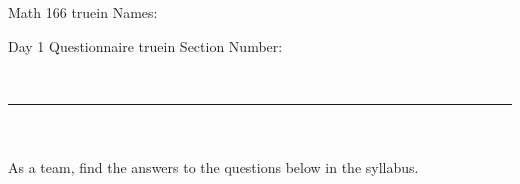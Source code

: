 \documentclass[12pt]{article}
\begin{document}
\pagestyle{empty} %

\noindent
{Math 166  truein  Names:\ \hrulefill}

\noindent
{Day 1 Questionnaire  truein  Section Number:\ \hrulefill}

\noindent 
\ \\
\hrule\ \\
\ \\
\noindent As a team, find the answers to the questions below in the syllabus. %
\end{document}
